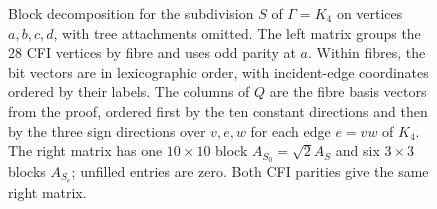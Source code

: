 \begin{figure}[tb]
\caption{Block decomposition for the subdivision $S$ of $\Gamma=K_4$
on vertices $a,b,c,d$, with tree attachments omitted.
The left matrix groups the $28$ CFI vertices by fibre and uses odd parity
at $a$. Within fibres, the bit vectors are in lexicographic order,
with incident-edge coordinates ordered by their labels.
The columns of $Q$ are the fibre basis vectors from the proof, ordered
first by the ten constant directions and then by the three sign directions
over $v,e,w$ for each edge $e=vw$ of $K_4$.
The right matrix has one $10\times10$ block $A_{S_0}=\sqrt2 A_S$ and
six $3\times3$ blocks $A_{S_e}$; unfilled entries are zero.
Both CFI parities give the same right matrix.}
\label{fig:ss-cfi-blocks}
\end{figure}
